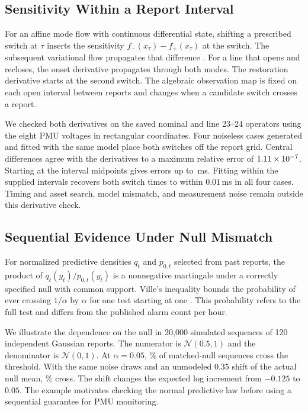 \subsection{Sensitivity Within a Report Interval}
For an affine mode flow with continuous differential state, shifting
a prescribed switch at $\tau$ inserts the sensitivity
$f_-(x_\tau)-f_+(x_\tau)$ at the switch. The subsequent variational
flow propagates that difference \cite{hiskens2000trajectory}. For a
line that opens and recloses, the onset derivative propagates through
both modes. The restoration derivative starts at the second switch.
The algebraic observation map is fixed on each open interval between
reports and changes when a candidate switch crosses a report.

We checked both derivatives on the saved nominal and line 23--24
operators using the eight PMU voltages in rectangular coordinates.
Four noiseless cases generated and fitted with the same model place
both switches off the report grid. Central differences agree with
the derivatives to a maximum relative error of
$1.11\times10^{-7}$. Starting at the interval midpoints gives
errors up to \SwitchMidpointError{}\,ms. Fitting within the supplied
intervals recovers both switch times to within $0.01$\,ms in all four
cases. Timing and asset search, model mismatch, and measurement noise
remain outside this derivative check.

\subsection{Sequential Evidence Under Null Mismatch}
For normalized predictive densities $q_t$ and $p_{0,t}$ selected from
past reports, the product of $q_t(y_t)/p_{0,t}(y_t)$ is a nonnegative
martingale under a correctly specified null with common support.
Ville's inequality bounds the probability of ever crossing $1/\alpha$
by $\alpha$ for one test starting at one \cite{howard2020timeuniform}. This probability refers to
the full test and differs from the published alarm count per hour.

We illustrate the dependence on the null in 20,000 simulated sequences
of 120 independent Gaussian reports. The numerator is
$\mathcal N(0.5,1)$ and the denominator is $\mathcal N(0,1)$.
At $\alpha=0.05$, \NullMatchedCrossing{}\% of matched-null sequences
cross the threshold. With the same noise draws and an unmodeled
$0.35$ shift of the actual null mean, \NullShiftedCrossing{}\% cross.
The shift changes the expected log increment from $-0.125$ to $0.05$.
The example motivates checking the normal predictive law before using
a sequential guarantee for PMU monitoring.
